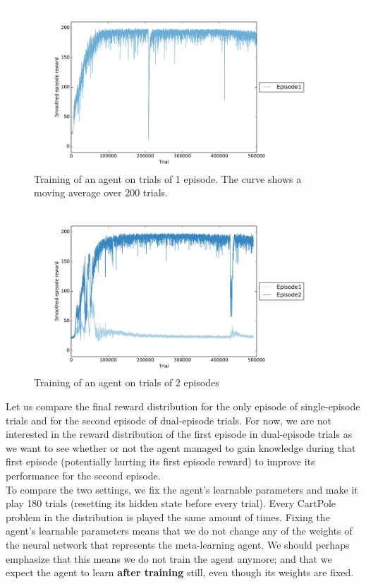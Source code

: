 \begin{figure}
	\centering
	\includegraphics[width=0.9\linewidth]{fig/20perms1ep_training.pdf}
	\caption{Training of an agent on trials of 1 episode. The curve
	shows a moving average over 200 trials.}
	\label{fig:20perms1ep_training}
\end{figure}


\begin{figure}
	\centering
	\includegraphics[width=0.9\linewidth]{fig/20perms2ep_training.pdf}
	\caption{Training of an agent on trials of 2 episodes}
	\label{fig:20perms2ep_training}
\end{figure}

Let us compare the final reward distribution for the only episode of 
single-episode trials and for the second episode of dual-episode trials.
For now, we are not interested in the reward distribution of the first episode
in dual-episode trials as we want to see whether or not the agent managed to
gain knowledge during that first episode (potentially hurting its first episode
reward) to improve its performance for the second episode.\\

To compare the two settings, we fix the agent's learnable parameters and make
it play 180 trials (resetting its hidden state before every trial). Every 
CartPole problem in the distribution is played the same amount of times.
Fixing the agent's learnable parameters means that we do not change
any of the weights of the neural network that represents the meta-learning
agent. We should perhaps emphasize that this means we do not train the agent
anymore; and that we expect the agent to learn \textbf{after training} still,
even though its weights are fixed.\\

